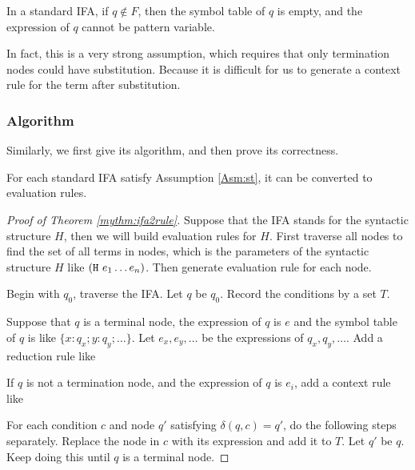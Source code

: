 \begin{Asm}
\label{Asm:st}
In a standard IFA, if $q \notin F$, then the symbol table of $q$ is empty, and the expression of $q$ cannot be pattern variable.
\end{Asm}

In fact, this is a very strong assumption, which requires that only termination nodes could have substitution. Because it is difficult for us to generate a context rule for the term after substitution. 

\subsubsection{Algorithm}

Similarly, we first give its algorithm, and then prove its correctness.

\begin{mythm}
\label{mythm:ifa2rule}
For each standard IFA satisfy Assumption \ref{Asm:st}, it can be converted to evaluation rules.
\end{mythm}

\begin{proof}[Proof of Theorem \ref{mythm:ifa2rule}]

Suppose that the IFA stands for the syntactic structure $H$, then we will build evaluation rules for $H$. First traverse all nodes to find the set of all terms in nodes, which is the parameters of the syntactic structure $H$ like $(\mbox{\tt H}~e_1 \ldots e_n)$. Then generate evaluation rule for each node.

Begin with $q_0$, traverse the IFA. Let $q$ be $q_0$. Record the conditions by a set $T$.

Suppose that $q$ is a terminal node, the expression of $q$ is $e$ and the symbol table of $q$ is like $\{x:q_x; y:q_y; \ldots\}$. Let $e_x,e_y,\ldots$ be the expressions of $q_x, q_y, \ldots$. Add a reduction rule like


If $q$ is not a termination node, and the expression of $q$ is $e_i$, add a context rule like


For each condition $c$ and node $q'$ satisfying $\delta(q, c)=q'$, do the following steps separately. Replace the node in $c$ with its expression and add it to $T$. Let $q'$ be $q$. Keep doing this until $q$ is a terminal node.

\end{proof}

